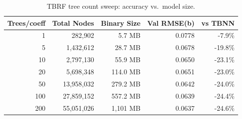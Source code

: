 \begin{table}[htbp]
\centering
\caption{TBRF tree count sweep: accuracy vs.~model size.}
\label{tab:tbrf_sweep}
\begin{tabular}{rrrrr}
\toprule
\textbf{Trees/coeff} & \textbf{Total Nodes} & \textbf{Binary Size} & \textbf{Val RMSE(b)} & \textbf{vs TBNN} \\
\midrule
1 & 282,902 & 5.7 MB & 0.0778 & -7.9\% \\
5 & 1,432,612 & 28.7 MB & 0.0678 & -19.8\% \\
10 & 2,797,130 & 55.9 MB & 0.0650 & -23.1\% \\
20 & 5,698,348 & 114.0 MB & 0.0651 & -23.0\% \\
50 & 13,958,032 & 279.2 MB & 0.0642 & -24.0\% \\
100 & 27,859,152 & 557.2 MB & 0.0639 & -24.4\% \\
200 & 55,051,026 & 1,101 MB & 0.0637 & -24.6\% \\
\bottomrule
\end{tabular}
\end{table}
